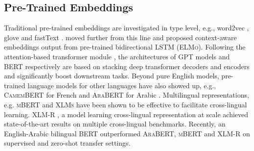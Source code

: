 \documentclass[11pt]{article}
\begin{document}
\subsection{Pre-Trained Embeddings}
Traditional pre-trained embeddings are investigated in type level, e.g., word2vec \cite{mikolov2013efficient}, glove \citep{pennington2014glove} and fastText \citep{bojanowski-etal-2017-enriching}. \citet{peters-etal-2018-deep} moved further from this line and proposed context-aware embeddings output from pre-trained bidirectional LSTM (\textsc{ELMo}). Following the attention-based transformer module \citep{NIPS2017_3f5ee243}, the architectures of \textsc{GPT} models \citep{radford2018improving, radford2019language, NEURIPS2020_1457c0d6} and \textsc{BERT} \citep{devlin-etal-2019-bert} respectively are based on stacking deep transformer decoders and encoders and significantly boost downstream tasks. Beyond pure English models, pre-trained language models for other languages have also showed up, e.g., \textsc{CamemBERT} for French \citep{martin2020camembert} and  \textsc{AraBERT} for Arabic \citep{baly2020arabert}.
Multilingual representations, e.g. \textsc{mBERT} and \textsc{XLMs} \citep{NEURIPS2019_c04c19c2} have been shown to be effective to facilitate cross-lingual learning. \textsc{XLM-R} \citep{conneau2020unsupervised}, a model learning cross-lingual representation at scale achieved state-of-the-art results on multiple cross-lingual benchmarks. Recently, an English-Arabic bilingual BERT \citep{lan-etal-2020-empirical} outperformed \textsc{AraBERT}, \textsc{mBERT} and \textsc{XLM-R} on supervised and zero-shot transfer settings.
\end{document}
